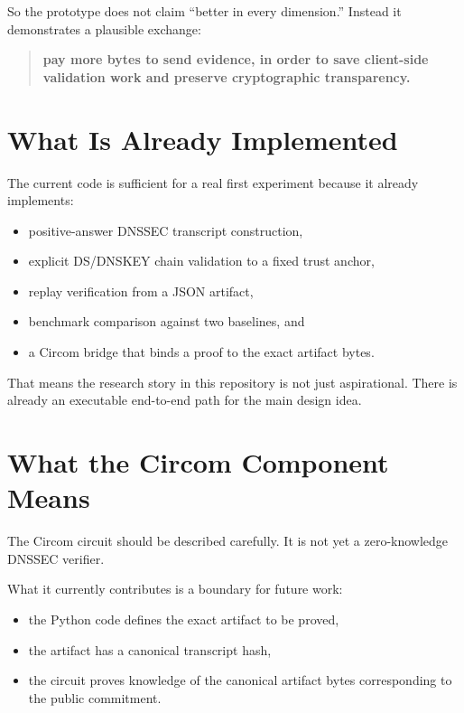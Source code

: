 \documentclass[11pt]{article}
\begin{document}
So the prototype does not claim ``better in every dimension.'' Instead it demonstrates a plausible exchange:

\begin{quote}
\textbf{pay more bytes to send evidence, in order to save client-side validation work and preserve cryptographic transparency.}
\end{quote}

\section{What Is Already Implemented}

The current code is sufficient for a real first experiment because it already implements:

\begin{itemize}[nosep]
    \item positive-answer DNSSEC transcript construction,
    \item explicit DS/DNSKEY chain validation to a fixed trust anchor,
    \item replay verification from a JSON artifact,
    \item benchmark comparison against two baselines, and
    \item a Circom bridge that binds a proof to the exact artifact bytes.
\end{itemize}

That means the research story in this repository is not just aspirational. There is already an executable end-to-end path for the main design idea.

\section{What the Circom Component Means}

The Circom circuit should be described carefully. It is not yet a zero-knowledge DNSSEC verifier.

What it currently contributes is a boundary for future work:

\begin{itemize}[nosep]
    \item the Python code defines the exact artifact to be proved,
    \item the artifact has a canonical transcript hash,
    \item the circuit proves knowledge of the canonical artifact bytes corresponding to the public commitment.
\end{itemize}
\end{document}
